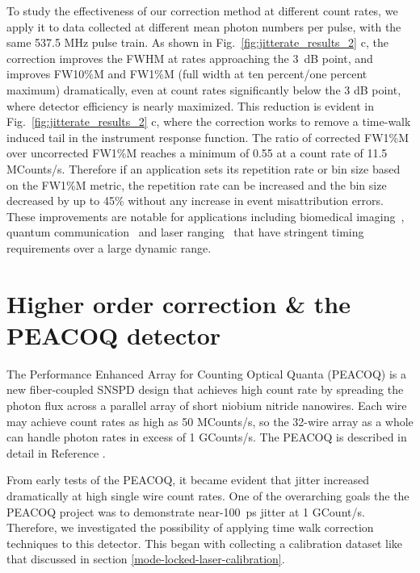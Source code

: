\documentclass[11pt]{caltech_thesis} %
\begin{document}
To study the effectiveness of our correction method at different count rates, we apply it to data collected at different mean photon numbers per pulse, with the same 537.5 MHz pulse train. As shown in Fig.~\ref{fig:jitterate_results_2} c, the correction improves the FWHM at rates approaching the 3~dB point, and improves FW10\%M and FW1\%M (full width at ten percent/one percent maximum) dramatically, even at count rates significantly below the 3 dB point, where detector efficiency is nearly maximized. This reduction is evident in Fig.~\ref{fig:jitterate_results_2} c, where the correction works to remove a time-walk induced tail in the instrument response function. The ratio of corrected FW1\%M over uncorrected FW1\%M reaches a minimum of 0.55 at a count rate of 11.5 MCounts/s. Therefore if an application sets its repetition rate or bin size based on the FW1\%M metric, the repetition rate can be increased and the bin size decreased by up to 45\% without any increase in event misattribution errors. These improvements are notable for applications including biomedical imaging~\autocite{Sutin16,Bruschini2019}, quantum communication~\autocite{Hadfield2009} and laser ranging~\autocite{McCarthy13} that have stringent timing requirements over a large dynamic range.

\hypertarget{higher-order-correction-the-peacoq-detector}{%
\section{Higher order correction \& the PEACOQ detector}\label{higher-order-correction-the-peacoq-detector}}

The Performance Enhanced Array for Counting Optical Quanta (PEACOQ) is a new fiber-coupled SNSPD design that achieves high count rate by spreading the photon flux across a parallel array of short niobium nitride nanowires. Each wire may achieve count rates as high as 50 MCounts/s, so the 32-wire array as a whole can handle photon rates in excess of 1 GCounts/s. The PEACOQ is described in detail in Reference \autocite{Craiciu23}.

From early tests of the PEACOQ, it became evident that jitter increased dramatically at high single wire count rates. One of the overarching goals the the PEACOQ project was to demonstrate near-100~ps jitter at 1 GCount/s. Therefore, we investigated the possibility of applying time walk correction techniques to this detector. This began with collecting a calibration dataset like that discussed in section \ref{mode-locked-laser-calibration}.
\end{document}
